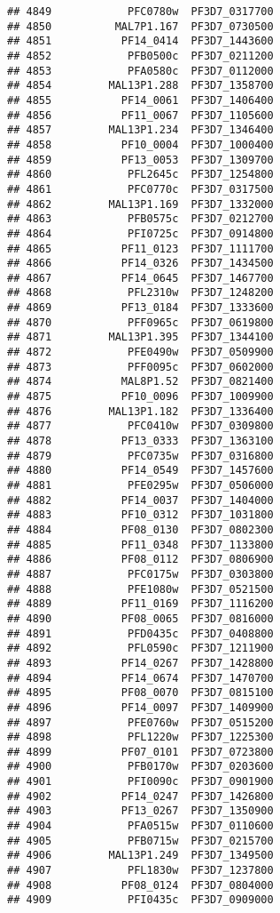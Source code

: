\documentclass[12pt, a4paper]{article}\usepackage[]{graphicx}\usepackage[]{color}
\makeatletter
\newenvironment{kframe}{%
 \def\at@end@of@kframe{}%
 \ifinner\ifhmode%
  \def\at@end@of@kframe{\end{minipage}}%
  \begin{minipage}{\columnwidth}%
 \fi\fi%
 \def\FrameCommand##1{\hskip\@totalleftmargin \hskip-\fboxsep
 \colorbox{shadecolor}{##1}\hskip-\fboxsep
     \hskip-\linewidth \hskip-\@totalleftmargin \hskip\columnwidth}%
 \MakeFramed {\advance\hsize-\width
   \@totalleftmargin\z@ \linewidth\hsize
   \@setminipage}}%
 {\par\unskip\endMakeFramed%
 \at@end@of@kframe}
\newenvironment{knitrout}{}{} %
\makeatother
\begin{document}
\begin{knitrout}
\begin{kframe}
\begin{verbatim}
## 4849            PFC0780w  PF3D7_0317700
## 4850          MAL7P1.167  PF3D7_0730500
## 4851           PF14_0414  PF3D7_1443600
## 4852            PFB0500c  PF3D7_0211200
## 4853            PFA0580c  PF3D7_0112000
## 4854         MAL13P1.288  PF3D7_1358700
## 4855           PF14_0061  PF3D7_1406400
## 4856           PF11_0067  PF3D7_1105600
## 4857         MAL13P1.234  PF3D7_1346400
## 4858           PF10_0004  PF3D7_1000400
## 4859           PF13_0053  PF3D7_1309700
## 4860            PFL2645c  PF3D7_1254800
## 4861            PFC0770c  PF3D7_0317500
## 4862         MAL13P1.169  PF3D7_1332000
## 4863            PFB0575c  PF3D7_0212700
## 4864            PFI0725c  PF3D7_0914800
## 4865           PF11_0123  PF3D7_1111700
## 4866           PF14_0326  PF3D7_1434500
## 4867           PF14_0645  PF3D7_1467700
## 4868            PFL2310w  PF3D7_1248200
## 4869           PF13_0184  PF3D7_1333600
## 4870            PFF0965c  PF3D7_0619800
## 4871         MAL13P1.395  PF3D7_1344100
## 4872            PFE0490w  PF3D7_0509900
## 4873            PFF0095c  PF3D7_0602000
## 4874           MAL8P1.52  PF3D7_0821400
## 4875           PF10_0096  PF3D7_1009900
## 4876         MAL13P1.182  PF3D7_1336400
## 4877            PFC0410w  PF3D7_0309800
## 4878           PF13_0333  PF3D7_1363100
## 4879            PFC0735w  PF3D7_0316800
## 4880           PF14_0549  PF3D7_1457600
## 4881            PFE0295w  PF3D7_0506000
## 4882           PF14_0037  PF3D7_1404000
## 4883           PF10_0312  PF3D7_1031800
## 4884           PF08_0130  PF3D7_0802300
## 4885           PF11_0348  PF3D7_1133800
## 4886           PF08_0112  PF3D7_0806900
## 4887            PFC0175w  PF3D7_0303800
## 4888            PFE1080w  PF3D7_0521500
## 4889           PF11_0169  PF3D7_1116200
## 4890           PF08_0065  PF3D7_0816000
## 4891            PFD0435c  PF3D7_0408800
## 4892            PFL0590c  PF3D7_1211900
## 4893           PF14_0267  PF3D7_1428800
## 4894           PF14_0674  PF3D7_1470700
## 4895           PF08_0070  PF3D7_0815100
## 4896           PF14_0097  PF3D7_1409900
## 4897            PFE0760w  PF3D7_0515200
## 4898            PFL1220w  PF3D7_1225300
## 4899           PF07_0101  PF3D7_0723800
## 4900            PFB0170w  PF3D7_0203600
## 4901            PFI0090c  PF3D7_0901900
## 4902           PF14_0247  PF3D7_1426800
## 4903           PF13_0267  PF3D7_1350900
## 4904            PFA0515w  PF3D7_0110600
## 4905            PFB0715w  PF3D7_0215700
## 4906         MAL13P1.249  PF3D7_1349500
## 4907            PFL1830w  PF3D7_1237800
## 4908           PF08_0124  PF3D7_0804000
## 4909            PFI0435c  PF3D7_0909000

\end{verbatim}
\end{kframe}
\end{knitrout}
\end{document}
